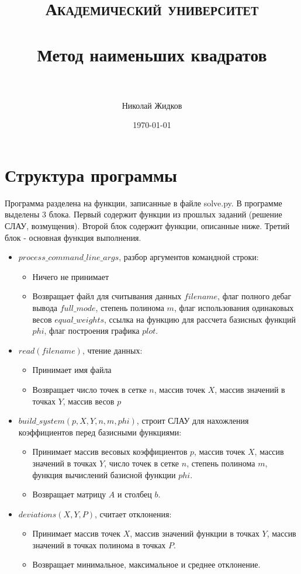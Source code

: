 \documentclass[paper=a4, fontsize=11pt]{scrartcl} %
\title{	
\normalfont \normalsize 
\textsc{Академический университет} \\ [25pt] %
\horrule{0.5pt} \\[0.4cm] %
\huge Метод наименьших квадратов \\ %
\horrule{2pt} \\[0.5cm] %
}
\author{Николай Жидков} %
\date{\normalsize\today} %
\numberwithin{equation}{section} %
\numberwithin{figure}{section} %
\numberwithin{table}{section} %
\begin{document}
\maketitle %


\section{Структура программы}

Программа разделена на функции, записанные в файле solve.py. 
В программе выделены 3 блока.
Первый содержит функции из прошлых заданий (решение СЛАУ, возмущения).
Второй блок содержит функции, описанные ниже.
Третий блок - основная функция выполнения.

\begin{itemize}
	\item $process\_command\_line\_args$, разбор аргументов командной строки:
		\begin{itemize}
		\item Ничего не принимает
		\item Возвращает файл для считывания данных $filename$, флаг полного дебаг вывода $full\_mode$, степень полинома $m$, флаг использования одинаковых весов $equal\_weights$, ссылка на функцию для рассчета базисных функций $phi$, флаг построения графика $plot$.
		\end{itemize}
	\item $read(filename)$, чтение данных:
		\begin{itemize}
		\item Принимает имя файла
		\item Возвращает число точек в сетке $n$, массив точек $X$, массив значений в точках $Y$, массив весов $p$
		\end{itemize}
    \item $build\_system(p, X, Y, n, m, phi)$, строит СЛАУ для нахожления коэффициентов перед базисными функциями:
        \begin{itemize}
		\item Принимает массив весовых коэффициентов $p$, массив точек $X$, массив значений в точках $Y$, число точек в сетке $n$, степень полинома $m$, функция вычислений базисной функции $phi$.
		\item Возвращает матрицу $A$ и столбец $b$.
		\end{itemize}
    \item $deviations(X, Y, P)$, считает отклонения:
        \begin{itemize}
		\item Принимает массив точек $X$, массив значений функции в точках $Y$, массив значений в точках полинома в точках $P$.
		\item Возвращает минимальное, максимальное и среднее отклонение.
		\end{itemize}
\end{itemize}
\end{document}
